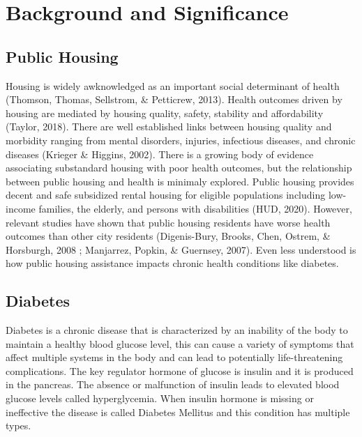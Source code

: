 \documentclass [11pt, proquest] {uwthesis}[2015/03/03]
\begin{document}
\titlepage
  \pagebreak


\copyrightpage

\setcounter{page}{-1}

\tableofcontents
\listoffigures
\listoftables



\textpages


\chapter{Background and Significance}\label{rmd-basics}

\section{Public Housing}\label{public-housing}

Housing is widely awknowledged as an important social determinant of
health (Thomson, Thomas, Sellstrom, \& Petticrew, 2013). Health outcomes
driven by housing are mediated by housing quality, safety, stability and
affordability (Taylor, 2018). There are well established links between
housing quality and morbidity ranging from mental disorders, injuries,
infectious diseases, and chronic diseases (Krieger \& Higgins, 2002).
There is a growing body of evidence associating substandard housing with
poor health outcomes, but the relationship between public housing and
health is minimaly explored. Public housing provides decent and safe
subsidized rental housing for eligible populations including low-income
families, the elderly, and persons with disabilities (HUD, 2020).
However, relevant studies have shown that public housing residents have
worse health outcomes than other city residents (Digenis-Bury, Brooks,
Chen, Ostrem, \& Horsburgh, 2008 ; Manjarrez, Popkin, \& Guernsey,
2007). Even less understood is how public housing assistance impacts
chronic health conditions like diabetes.

\section{Diabetes}\label{diabetes}

Diabetes is a chronic disease that is characterized by an inability of
the body to maintain a healthy blood glucose level, this can cause a
variety of symptoms that affect multiple systems in the body and can
lead to potentially life-threatening complications. The key regulator
hormone of glucose is insulin and it is produced in the pancreas. The
absence or malfunction of insulin leads to elevated blood glucose levels
called hyperglycemia. When insulin hormone is missing or ineffective the
disease is called Diabetes Mellitus and this condition has multiple
types.
\end{document}
